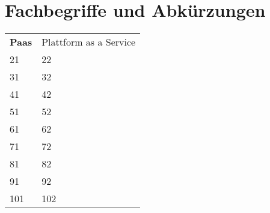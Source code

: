\section{Fachbegriffe und Abkürzungen}
\begin{tabular}{ll}
	\textbf{Paas} & Plattform as a Service\\
	21 & 22\\
	31 & 32\\
	41 & 42\\
	51 & 52\\
	61 & 62\\
	71 & 72\\
	81 & 82\\
	91 & 92\\
	101 & 102\\
\end{tabular}
